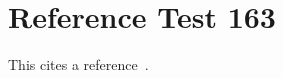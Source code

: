 \documentclass{article}
\begin{document}
\section{Reference Test 163}
This cites a reference~\cite{test163}.

\end{document}
